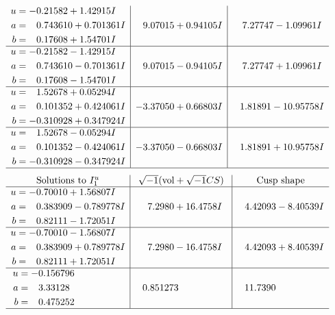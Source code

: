 \documentclass[1p]{elsarticle_modified}
\theoremstyle{definition}
\newcommand{\I}{\sqrt{-1}}
\begin{document}
$$\begin{array}{c|c|c}
\begin{aligned}
u &= -0.21582 + 1.42915 I \\
a &= \phantom{-}0.743610 + 0.701361 I \\
b &= \phantom{-}0.17608 + 1.54701 I\end{aligned}
 & \phantom{-}9.07015 + 0.94105 I & \phantom{-}7.27747 - 1.09961 I \\ \hline\begin{aligned}
u &= -0.21582 - 1.42915 I \\
a &= \phantom{-}0.743610 - 0.701361 I \\
b &= \phantom{-}0.17608 - 1.54701 I\end{aligned}
 & \phantom{-}9.07015 - 0.94105 I & \phantom{-}7.27747 + 1.09961 I \\ \hline\begin{aligned}
u &= \phantom{-}1.52678 + 0.05294 I \\
a &= \phantom{-}0.101352 + 0.424061 I \\
b &= -0.310928 + 0.347924 I\end{aligned}
 & -3.37050 + 0.66803 I & \phantom{-}1.81891 - 10.95758 I \\ \hline\begin{aligned}
u &= \phantom{-}1.52678 - 0.05294 I \\
a &= \phantom{-}0.101352 - 0.424061 I \\
b &= -0.310928 - 0.347924 I\end{aligned}
 & -3.37050 - 0.66803 I & \phantom{-}1.81891 + 10.95758 I\\
 \hline 
 \end{array}$$\newpage$$\begin{array}{c|c|c}  
\text{Solutions to }I^u_{1}& \I (\text{vol} + \sqrt{-1}CS) & \text{Cusp shape}\\
 \hline 
\begin{aligned}
u &= -0.70010 + 1.56807 I \\
a &= \phantom{-}0.383909 - 0.789778 I \\
b &= \phantom{-}0.82111 - 1.72051 I\end{aligned}
 & \phantom{-}7.2980 + 16.4758 I & \phantom{-}4.42093 - 8.40539 I \\ \hline\begin{aligned}
u &= -0.70010 - 1.56807 I \\
a &= \phantom{-}0.383909 + 0.789778 I \\
b &= \phantom{-}0.82111 + 1.72051 I\end{aligned}
 & \phantom{-}7.2980 - 16.4758 I & \phantom{-}4.42093 + 8.40539 I \\ \hline\begin{aligned}
u &= -0.156796\phantom{ +0.000000I} \\
a &= \phantom{-}3.33128\phantom{ +0.000000I} \\
b &= \phantom{-}0.475252\phantom{ +0.000000I}\end{aligned}
 & \phantom{-}0.851273\phantom{ +0.000000I} & \phantom{-}11.7390\phantom{ +0.000000I}\\
 \hline 
 \end{array}$$\newpage\newpage\renewcommand{\arraystretch}{1}
\end{document}
